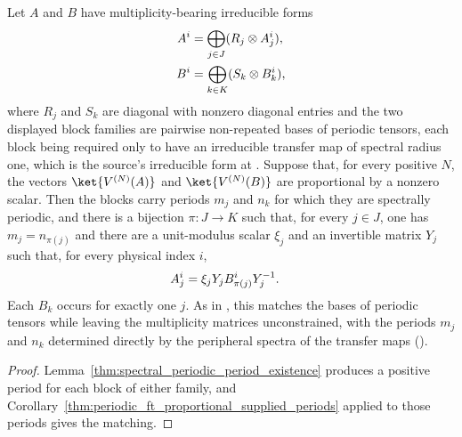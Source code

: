\begin{theorem}
    \label{thm:periodic_ft_proportional}
    \leanok
    Let $A$ and $B$ have multiplicity-bearing irreducible forms
    \begin{align}
        A^i & =\bigoplus_{j\in J}(R_j\otimes A_j^i),
        \notag                                       \\
        B^i & =\bigoplus_{k\in K}(S_k\otimes B_k^i),
        \notag
    \end{align}
    where $R_j$ and $S_k$ are diagonal with nonzero diagonal entries and the
    two displayed block families are pairwise non-repeated bases of periodic
    tensors, each block being required only to have an irreducible transfer map
    of spectral radius one, which is the source's irreducible form at
    \cite[lines~248--261]{DeLasCuevas2017Irreducible}.
    Suppose that, for every positive $N$, the vectors
    $\ket{V^{(N)}(A)}$ and $\ket{V^{(N)}(B)}$ are proportional by a nonzero
    scalar. Then the blocks carry periods $m_j$ and $n_k$ for which they are
    spectrally periodic, and there is a bijection $\pi\colon J\to K$ such that,
    for every $j\in J$, one has $m_j=n_{\pi(j)}$ and there
    are a unit-modulus scalar $\xi_j$ and an invertible matrix $Y_j$ such that,
    for every physical index $i$,
    \begin{align}
        A_j^i & =\xi_jY_jB_{\pi(j)}^iY_j^{-1}.
        \notag
    \end{align}
    Each $B_k$ occurs for exactly one $j$. As in
    \cite[Theorem~3.4, lines~613--623]{DeLasCuevas2017Irreducible}, this
    matches the bases of periodic tensors while leaving the multiplicity
    matrices unconstrained, with the periods $m_j$ and $n_k$ determined
    directly by the peripheral spectra of the transfer maps
    (\cite[lines~257--258]{DeLasCuevas2017Irreducible}).
\end{theorem}
\begin{proof}
    \leanok
    Lemma~\ref{thm:spectral_periodic_period_existence} produces a positive
    period for each block of either family, and
    Corollary~\ref{thm:periodic_ft_proportional_supplied_periods} applied to
    those periods gives the matching.
\end{proof}

